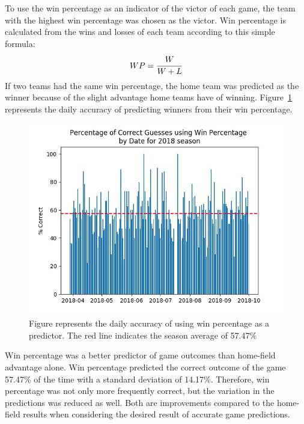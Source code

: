\documentclass{article}
\begin{document}
To use the win percentage as an indicator of the victor of each game,
the team with the highest win percentage was chosen as the victor.
Win percentage is calculated from the wins and losses of each team according to
this simple formula:
\[
    WP
    =
    \cfrac{W}{W+L}
\]
If two teams had the same win percentage,
the home team was predicted as the winner because of the slight advantage home
teams have of winning.
Figure~\ref{Fig:WP} represents the daily accuracy of predicting winners from 
their win percentage.
\begin{figure}[ht]
    \centering
    \includegraphics[width=.8\textwidth]{wp-correctness.jpg}
    \caption{Figure \label{Fig:WP} represents the daily accuracy of using win
    percentage as a predictor.  The red line indicates the season
average of 57.47\%}
\end{figure}
Win percentage was a better predictor of game outcomes than home-field advantage
alone.
Win percentage predicted the correct outcome of the game 57.47\% of the time
with a standard deviation of 14.17\%.
Therefore,
win percentage was not only more frequently correct,
but the variation in the predictions was reduced as well.
Both are improvements compared to the home-field results when considering the
desired result of accurate game predictions.\par
\end{document}
